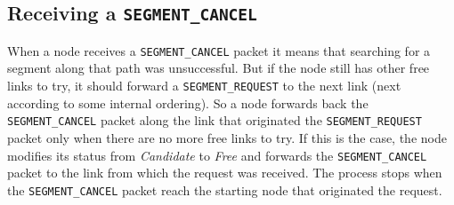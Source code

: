 \subsection{Receiving a \texttt{SEGMENT\_CANCEL}}
When a node receives a \texttt{SEGMENT\_CANCEL} packet it means that searching
for a segment along that path was unsuccessful. But if the node still
has other free links to try, it should forward a \texttt{SEGMENT\_REQUEST} to
the next link (next according to some internal ordering). So a node
forwards back the \texttt{SEGMENT\_CANCEL} packet along the link that originated
the \texttt{SEGMENT\_REQUEST} packet only when there are no more free links to
try. If this is the case, the node modifies its status from
\emph{Candidate} to \emph{Free} and forwards the \texttt{SEGMENT\_CANCEL} packet to the link from which
the request was received. The process stops when the \texttt{SEGMENT\_CANCEL}
packet reach the starting node that originated the request.

